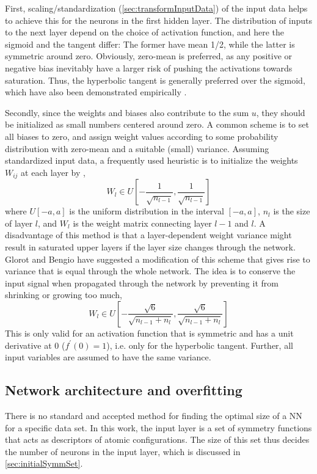 \documentclass[twoside,english]{uiofysmaster}
\begin{document}
First, scaling/standardization (\autoref{sec:transformInputData}) of the input data helps to achieve this for
the neurons in the first hidden layer. The distribution of inputs to the next layer depend on the choice of activation function, and 
here the sigmoid and the tangent differ: The former have mean 1/2, while the latter is symmetric around zero. 
Obviously, zero-mean is preferred, as any positive or negative bias inevitably have a larger risk of pushing the activations 
towards saturation. Thus, the hyperbolic tangent is generally preferred over the sigmoid, which have also been demonstrated 
empirically \cite{Karlik11} \cite{Glorot10}. 

Secondly, since the weights and biases also contribute to the sum $u$, they should be initialized as small numbers centered around zero. 
A common scheme is to 
set all biases to zero, and assign weight values according to some probability distribution with zero-mean and 
a suitable (small) variance. Assuming standardized input data, 
a frequently used heuristic is to initialize the weights $W_{ij}$ at each layer by 
\cite{Bengio12} \cite{LeCun12},
\begin{equation}
 W_l \in U\left[-\frac{1}{\sqrt{n_{l-1}}}, \frac{1}{\sqrt{n_{l-1}}}\right]
\end{equation}
where $U[-a, a]$ is the uniform distribution in the interval $[-a,a]$, $n_l$ is the size of layer $l$, and 
$W_l$ is the weight matrix connecting layer $l-1$ and $l$. 
A disadvantage of this method is that a layer-dependent weight variance might result in saturated upper layers 
if the layer size changes through the network.  
Glorot and Bengio \cite{Glorot10} have suggested a modification of this scheme that gives rise to variance that 
is equal through the whole network. The idea is to 
conserve the input signal when propagated through the network by preventing it from shrinking or growing too much,  
\begin{equation}
 W_l \in U\left[-\frac{\sqrt{6}}{\sqrt{n_{l-1}+n_{l}}}, \frac{\sqrt{6}}{\sqrt{n_{l-1}+n_{l}}}  \right]
\end{equation}
This is only valid for an activation function that is symmetric and has a unit derivative at 0 ($f^\prime(0) = 1$), i.e. only 
for the hyperbolic tangent. Further, all input variables are assumed to have the same variance.




\subsection{Network architecture and overfitting} \label{sec:overfitting}
There is no standard and accepted method for finding the optimal size of a NN for a specific data set. 
In this work, the input layer is a set of symmetry functions that acts as descriptors of atomic configurations.
The size of this set thus decides the number of neurons in the input layer, which is discussed in \autoref{sec:initialSymmSet}. 
\end{document}
